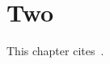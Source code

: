 \chapter{Two}
This chapter cites~\cite{steiner_derive_2011,steiner_ijcisim_2013}.

\printbibliography[heading=subbibliography]
